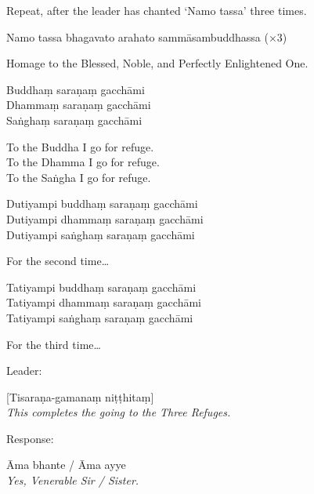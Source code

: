 \begin{instruction}
  Repeat, after the leader has chanted ‘Namo tassa’ three times.
\end{instruction}

Namo tassa bhagavato arahato sammāsambuddhassa (×3)

\begin{english}
  Homage to the Blessed, Noble, and Perfectly Enlightened One.
\end{english}

\ifhandbookedition
\clearpage
\fi

Buddhaṃ saraṇaṃ gacchāmi\\
Dhammaṃ saraṇaṃ gacchāmi\\
Saṅghaṃ saraṇaṃ gacchāmi

\begin{english}
  To the Buddha I go for refuge.\\
  To the Dhamma I go for refuge.\\
  To the Saṅgha I go for refuge.
\end{english}

Dutiyampi buddhaṃ saraṇaṃ gacchāmi\\
Dutiyampi dhammaṃ saraṇaṃ gacchāmi\\
Dutiyampi saṅghaṃ saraṇaṃ gacchāmi

\begin{english}
  For the second time\ldots
\end{english}

Tatiyampi buddhaṃ saraṇaṃ gacchāmi\\
Tatiyampi dhammaṃ saraṇaṃ gacchāmi\\
Tatiyampi saṅghaṃ saraṇaṃ gacchāmi

\begin{english}
  For the third time\ldots
\end{english}

\begin{instruction}
  Leader:
\end{instruction}

[Tisaraṇa-gamanaṃ niṭṭhitaṃ]\\
\emph{This completes the going to the Three Refuges.}

\begin{instruction}
  Response:
\end{instruction}

Āma bhante / Āma ayye\\
\emph{Yes, Venerable Sir / Sister.}

